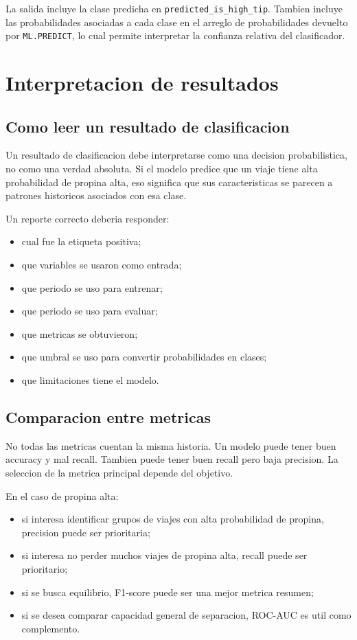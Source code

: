 \documentclass[12pt]{article}
\begin{document}
La salida incluye la clase predicha en \texttt{predicted\_is\_high\_tip}. Tambien incluye las probabilidades asociadas a cada clase en el arreglo de probabilidades devuelto por \texttt{ML.PREDICT}, lo cual permite interpretar la confianza relativa del clasificador.

\section{Interpretacion de resultados}
\subsection{Como leer un resultado de clasificacion}
Un resultado de clasificacion debe interpretarse como una decision probabilistica, no como una verdad absoluta. Si el modelo predice que un viaje tiene alta probabilidad de propina alta, eso significa que sus caracteristicas se parecen a patrones historicos asociados con esa clase.

Un reporte correcto deberia responder:
\begin{itemize}[leftmargin=*]
\item cual fue la etiqueta positiva;
\item que variables se usaron como entrada;
\item que periodo se uso para entrenar;
\item que periodo se uso para evaluar;
\item que metricas se obtuvieron;
\item que umbral se uso para convertir probabilidades en clases;
\item que limitaciones tiene el modelo.
\end{itemize}

\subsection{Comparacion entre metricas}
No todas las metricas cuentan la misma historia. Un modelo puede tener buen accuracy y mal recall. Tambien puede tener buen recall pero baja precision. La seleccion de la metrica principal depende del objetivo.

En el caso de propina alta:
\begin{itemize}[leftmargin=*]
\item si interesa identificar grupos de viajes con alta probabilidad de propina, precision puede ser prioritaria;
\item si interesa no perder muchos viajes de propina alta, recall puede ser prioritario;
\item si se busca equilibrio, F1-score puede ser una mejor metrica resumen;
\item si se desea comparar capacidad general de separacion, ROC-AUC es util como complemento.
\end{itemize}
\end{document}
